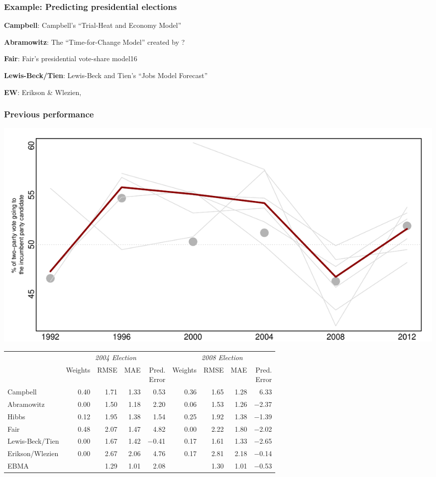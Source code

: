 \documentclass[xcolor=dvipsnames]{beamer}
\begin{document}
\begin{frame}
\frametitle{Example: Predicting presidential elections}

\bi
\item \textbf{Campbell}: Campbell’s “Trial-Heat and Economy Model” 
\item \textbf{Abramowitz}: The “Time-for-Change Model” created by ?
\item \textbf{Fair}: Fair’s presidential vote-share model16
\item \textbf{Lewis-Beck/Tien}: Lewis-Beck and Tien’s “Jobs Model Forecast” 
\item \textbf{EW}: Erikson \& Wlezien,
\ei
\end{frame}



\begin{frame}
\frametitle{Previous performance}

\centering
\includegraphics[scale=.6]{PotentialGraph}

\end{frame}

\begin{frame}
\scriptsize
\begin{center}
\begin{tabular}{l rrrrrrrr}	
  \toprule
   &\multicolumn{4}{c}{\textit{2004 Election}} &\multicolumn{4}{c}{\textit{2008 Election}} \\ 
 &	Weights&	RMSE &MAE &\shortstack{Pred. \\ Error}
 &Weights&	RMSE&	MAE &  \shortstack{Pred.\\  Error}\\
\midrule
 Campbell               &0.40&1.71&1.33 &0.53&0.36&1.65&1.28&6.33\\
  Abramowitz        	&0.00&1.50&1.18&2.20&0.06&1.53&1.26&$-$2.37\\
  Hibbs                   	&0.12&1.95&1.38&1.54&0.25&1.92&1.38&$-$1.39\\
  Fair                      	&0.48&2.07&1.47&4.82&0.00&2.22&1.80&$-$2.02 \\
  Lewis-Beck/Tien 	&0.00&1.67&1.42&$-$0.41&	0.17&1.61&1.33&$-$2.65\\
  Erikson/Wlezien 	&0.00&2.67&2.06&4.76&0.17&2.81&2.18&$-$0.14\\
   EBMA                    	&	       	&1.29&1.01&2.08&
  &1.30&1.01&$-$0.53\\
\bottomrule
\end{tabular}
 \end{center}
\end{frame}
\end{document}

